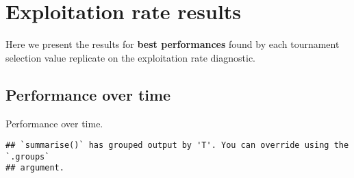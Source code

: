\documentclass[]{book}
\newenvironment{Shaded}{\begin{snugshade}}{\end{snugshade}}
\newcommand{\DataTypeTok}[1]{\textcolor[rgb]{0.13,0.29,0.53}{#1}}
\newcommand{\KeywordTok}[1]{\textcolor[rgb]{0.13,0.29,0.53}{\textbf{#1}}}
\newcommand{\NormalTok}[1]{#1}
\newcommand{\OperatorTok}[1]{\textcolor[rgb]{0.81,0.36,0.00}{\textbf{#1}}}
\newcommand{\StringTok}[1]{\textcolor[rgb]{0.31,0.60,0.02}{#1}}
\begin{document}
\hypertarget{exploitation-rate-results-2}{%
\section{Exploitation rate results}\label{exploitation-rate-results-2}}

Here we present the results for \textbf{best performances} found by each tournament selection value replicate on the exploitation rate diagnostic.

\hypertarget{performance-over-time-6}{%
\subsection{Performance over time}\label{performance-over-time-6}}

Performance over time.

\begin{Shaded}
\end{Shaded}

\begin{verbatim}
## `summarise()` has grouped output by 'T'. You can override using the `.groups`
## argument.
\end{verbatim}
\end{document}
